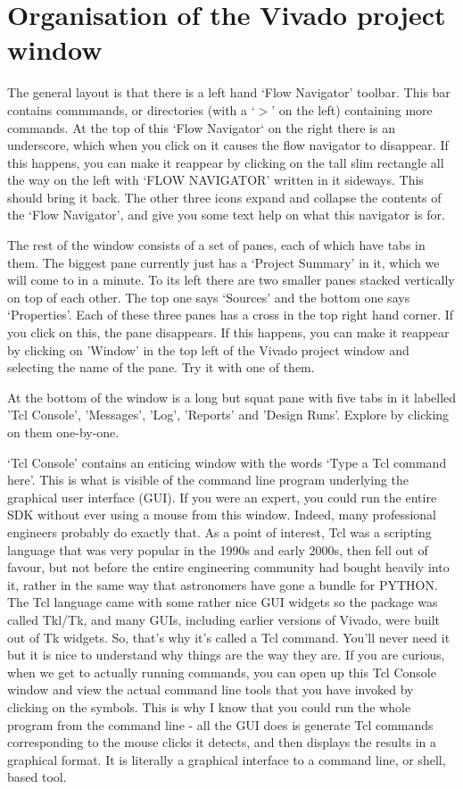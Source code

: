 \documentclass[../physical_computing.tex]{subfiles}
\begin{document}
\section{Organisation of the Vivado project window}
\label{sec:vivado_project_window}

The general layout is that there is a left hand `Flow Navigator' toolbar. This bar contains commmands, or directories (with a `$>$' on the left) containing more commands. At the top of this `Flow Navigator` on the right there is an underscore, which when you click on it causes the flow navigator to disappear. If this happens, you can make it reappear by clicking on the tall slim rectangle all the way on the left with `FLOW NAVIGATOR' written in it sideways. This should bring it back. The other three icons expand and collapse the contents of the `Flow Navigator', and give you some text help on what this navigator is for. 

The rest of the window consists of a set of panes, each of which have tabs in them. The biggest pane currently just has a `Project Summary' in it, which we will come to in a minute. To its left there are two smaller panes stacked vertically on top of each other. The top one says `Sources' and the bottom one says `Properties'. Each of these three panes has a cross in the top right hand corner. If you click on this, the pane disappears. If this happens, you can make it reappear by clicking on 'Window' in the top left of the Vivado project window and selecting the name of the pane. Try it with one of them.

At the bottom of the window is a long but squat pane with five tabs in it labelled 'Tcl Console', 'Messages', 'Log', 'Reports' and 'Design Runs'. Explore by clicking on them one-by-one. 

`Tcl Console' contains an enticing window with the words `Type a Tcl command here'. This is what is visible of the command line program underlying the graphical user interface (GUI). If you were an expert, you could run the entire SDK without ever using a mouse from this window. Indeed, many professional engineers probably do exactly that. As a point of interest, Tcl was a scripting language that was very popular in the 1990s and early 2000s, then fell out of favour, but not before the entire engineering community had bought heavily into it, rather in the same way that astronomers have gone a bundle for PYTHON. The Tcl language came with some rather nice GUI widgets so the package was called Tkl/Tk, and many GUIs, including earlier versions of Vivado, were built out of Tk widgets. So, that's why it's called a Tcl command. You'll never need it but it is nice to understand why things are the way they are. If you are curious, when we get to actually running commands, you can open up this Tcl Console window and view the actual command line tools that you have invoked by clicking on the symbols. This is why I know that you could run the whole program from the command line - all the GUI does is generate Tcl commands corresponding to the mouse clicks it detects, and then displays the results in a graphical format. It is literally a graphical interface to a command line, or shell, based tool.
\end{document}
